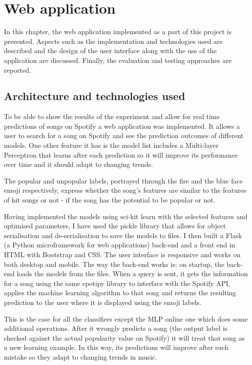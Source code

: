 \chapter{Web application}

 In this chapter, the web application implemented as a part of this project is presented. Aspects such as the implementation and technologies used are described and the design of the user interface along with the use of the application are discussed. Finally, the evaluation and testing approaches are reported.
 
\section{Architecture and technologies used}
To be able to show the results of the experiment and allow for real time predictions of songs on Spotify a web application was implemented. It allows a user to search for a song on Spotify and see the prediction outcomes of different models. One other feature it has is the model list includes a Multi-layer Perceptron that learns after each prediction so it will improve its performance over time and it should adapt to changing trends.

The popular and unpopular labels, portrayed through the fire and the blue face emoji respectively, express whether the song's features are similar to the features of hit songs or not - if the song has the potential to be popular or not.

Having implemented the models using sci-kit learn with the selected features and optimised parameters, I have used the pickle library \cite{PickleOnline:online} that allows for object serialisation and de-serialisation to save the models to files. I then built a Flask (a Python microframework for web applications) \cite{FlaskOnline:online} back-end and a front end in HTML with Bootstrap and CSS. The user interface is responsive and works on both desktop and mobile. The way the back-end works is: on startup, the back-end loads the models from the files. When a query is sent, it gets the information for a song using the same spotipy library to interface with the Spotify API, applies the machine learning algorithm to that song and returns the resulting prediction to the user where it is displayed using the emoji labels. 

This is the case for all the classifiers except the MLP online one which does some additional operations. After it wrongly predicts a song (the output label is checked against the actual popularity value on Spotify) it will treat that song as a new learning example. In this way, its predictions will improve after each mistake so they adapt to changing trends in music.

